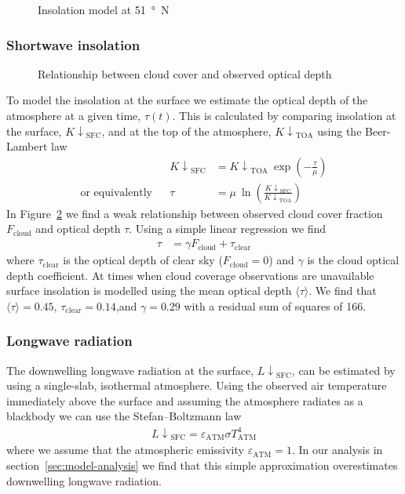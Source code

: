 \documentclass[a4paper,titlepage]{article}
\newcommand\Kdownsfc{{K\!\!\downarrow}_\mathrm{SFC}}
\newcommand\Kdowntoa{{K\!\!\downarrow}_\mathrm{TOA}}
\newcommand\Ldownsfc{{L\!\!\downarrow}_\mathrm{SFC}}
\begin{document}
\begin{figure}
\centering

\caption{Insolation model at \SI{51}{\degree N}}
\label{fig:toa-model}
\end{figure}

\subsubsection{Shortwave insolation}
\begin{figure}
\centering

\caption{Relationship between cloud cover and observed optical depth}
\label{fig:cloud-tau-fit}
\end{figure}

To model the insolation at the surface we estimate the optical depth of the atmosphere at a given time, $\tau(t)$.  This is calculated by comparing insolation at the surface, $\Kdownsfc$, and at the top of the atmosphere, $\Kdowntoa$ using the Beer-Lambert law
\begin{align}
&& \Kdownsfc &= \Kdowntoa\: \exp \left( -\frac{\tau}{\mu} \right) \\
\text{or equivalently} && \tau &= \mu \: \ln \left( \frac{\Kdownsfc}{\Kdowntoa} \right)
\end{align}
In Figure~\ref{fig:cloud-tau-fit} we find a weak relationship between observed cloud cover fraction $F_\mathrm{cloud}$ and optical depth $\tau$.  Using a simple linear regression we find
\begin{align}
\tau &= \gamma F_\mathrm{cloud} + \tau_\mathrm{clear}
\end{align}
where $\tau_\mathrm{clear}$ is the optical depth of clear sky ($F_\mathrm{cloud} = 0$) and $\gamma$ is the cloud optical depth coefficient.  At times when cloud coverage observations are unavailable surface insolation is modelled using the mean optical depth $\langle \tau \rangle$.  We find that $\langle \tau \rangle = 0.45$, $\tau_\mathrm{clear} = 0.14$,and $\gamma =  0.29$ with a residual sum of squares of 166.

\subsubsection{Longwave radiation}
The downwelling longwave radiation at the surface, $\Ldownsfc$, can be estimated by using a single-slab, isothermal atmosphere.  Using the observed air temperature immediately above the surface and assuming the atmosphere radiates as a blackbody we can use the Stefan--Boltzmann law
\begin{align}
\Ldownsfc = \varepsilon_\mathrm{ATM} \sigma T_\mathrm{ATM}^4 \label{eq:stefan-boltzmann}
\end{align}
where we assume that the atmospheric emissivity $\varepsilon_\mathrm{ATM} = 1$.  In our analysis in section~\ref{sec:model-analysis} we find that this simple approximation overestimates downwelling longwave radiation.
\end{document}
